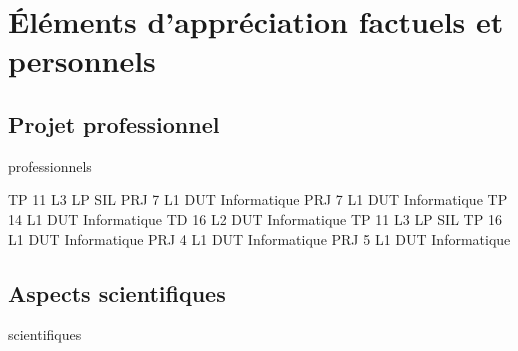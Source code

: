 \chapter{Éléments d'appréciation factuels et personnels}
  \section{Projet professionnel}
    \begin{modules}{professionnels}
    \end{modules}

    \begin{enseignements}
                   {TP}
                   {11} %
                   {L3}
                   {LP SIL}
                   {PRJ}
                   {7} %
                   {L1}
                   {DUT Informatique}
                   {PRJ}
                   {7} %
                   {L1}
                   {DUT Informatique}
                   {TP}
                   {14} %
                   {L1}
                   {DUT Informatique}
                   {TD}
                   {16} %
                   {L2}
                   {DUT Informatique}
                   {TP}
                   {11} %
                   {L3}
                   {LP SIL}
                   {TP}
                   {16} %
                   {L1}
                   {DUT Informatique}
                   {PRJ}
                   {4} %
                   {L1}
                   {DUT Informatique}
                   {PRJ}
                   {5} %
                   {L1}
                   {DUT Informatique}
    \end{enseignements}

  \section{Aspects scientifiques}
    \begin{modules}{scientifiques}
    \end{modules}

